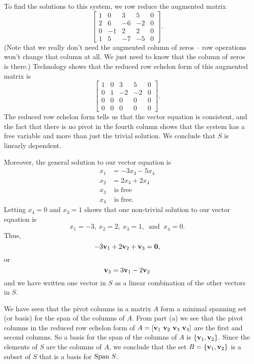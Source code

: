 \begin{example}
To find the solutions to this system, we row reduce the augmented matrix
\[\left[ \begin{array}{crrr|c} 1&0&3&5&0 \\ 2&6&-6&-2&0 \\ 0&-1&2&2&0 \\ 1&5&-7&-5&0 \end{array} \right].\]
(Note that we really don't need the augmented column of zeros -- row operations won't change that column at all. We just need to know that the column of zeros is there.) Technology shows that the reduced row echelon form of this augmented matrix is 
\[\left[ \begin{array}{cccr|c} 1&0&3&5&0 \\ 0&1&-2&-2&0 \\ 0&0&0&0&0 \\ 0&0&0&0&0 \end{array} \right].\]
The reduced row echelon form tells us that the vector equation is consistent, and the fact that there is no pivot in the fourth column shows that the system has a free variable and more than just the trivial solution. We conclude that $S$ is linearly dependent. 

Moreover, the general solution to our vector equation is
\begin{align*}
x_1 &= -3x_3 - 5x_4 \\
x_2 &= 2x_3 + 2x_4 \\
x_3 &\text{ is free} \\
x_4 &\text{ is free}.
\end{align*}
Letting $x_4 = 0$ and $x_3 = 1$ shows that one non-trivial solution to our vector equation is
\[x_1 = -3, \ x_2 = 2, \ x_3 = 1, \ \text{ and } \ x_4 = 0.\]
Thus,
\[-3\mathbf{v}_1 + 2\mathbf{v}_2 + \mathbf{v}_3 = \mathbf{0},\]
or
\[\mathbf{v}_3 = 3\mathbf{v}_1 - 2\mathbf{v}_2\]
and we have written one vector in $S$ as a linear combination of the other vectors in $S$. 

\item We have seen that the pivot columns in a matrix $A$ form a minimal spanning set (or basis) for the span of the columns of $A$. From part (a) we see that the pivot columns in the reduced row echelon form of $A = [\vv_1 \ \vv_2 \ \vv_3 \ \vv_4]$ are the first and second columns. So a basis for the span of the columns of $A$ is $\{\mathbf{v}_1, \mathbf{v}_2\}$. Since the elements of $S$ are the columns of $A$, we conclude that the set $B = \{\mathbf{v}_1, \mathbf{v}_2\}$ is a subset of $S$ that is a basis for $\text{Span} \ S$. 

\ea
\end{example}

